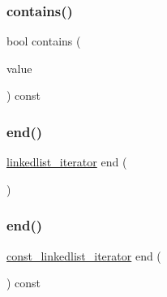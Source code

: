 \mbox{\label{classLinkedList_a6fbc1a150987e7e5320d244a3baeb560}} 
\subsubsection{\texorpdfstring{contains()}{contains()}}
{\footnotesize\ttfamily bool contains (\begin{DoxyParamCaption}\item[{const Value\+Type \&}]{value }\end{DoxyParamCaption}) const}

\mbox{\label{classLinkedList_af97c149df5db3e2a35dfeb3797582748}} 
\subsubsection{\texorpdfstring{end()}{end()}\hspace{0.1cm}{\footnotesize\ttfamily [1/2]}}
{\footnotesize\ttfamily \mbox{\hyperlink{classLinkedList_1_1linkedlist__iterator}{linkedlist\+\_\+iterator}} end (\begin{DoxyParamCaption}{ }\end{DoxyParamCaption})\hspace{0.3cm}{\ttfamily [inline]}}

\mbox{\label{classLinkedList_af3382437fa7ab4f2148e2fa27be4c477}} 
\subsubsection{\texorpdfstring{end()}{end()}\hspace{0.1cm}{\footnotesize\ttfamily [2/2]}}
{\footnotesize\ttfamily \mbox{\hyperlink{classLinkedList_1_1const__linkedlist__iterator}{const\+\_\+linkedlist\+\_\+iterator}} end (\begin{DoxyParamCaption}{ }\end{DoxyParamCaption}) const\hspace{0.3cm}{\ttfamily [inline]}}

\mbox{\label{classLinkedList_a0e2f3f8756f745a9243a086687c414f4}} 
